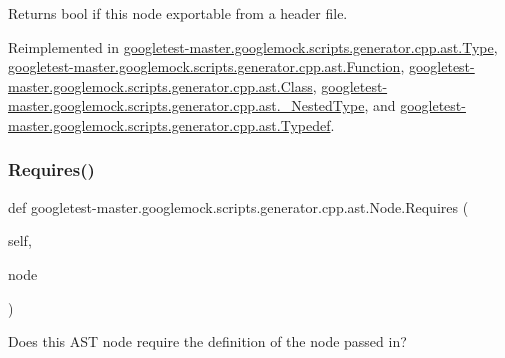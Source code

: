 \begin{DoxyVerb}Returns bool if this node exportable from a header file.\end{DoxyVerb}
 

Reimplemented in \mbox{\hyperlink{classgoogletest-master_1_1googlemock_1_1scripts_1_1generator_1_1cpp_1_1ast_1_1_type_a964085017b8352d9dfe441d1608ee5f4}{googletest-\/master.\+googlemock.\+scripts.\+generator.\+cpp.\+ast.\+Type}}, \mbox{\hyperlink{classgoogletest-master_1_1googlemock_1_1scripts_1_1generator_1_1cpp_1_1ast_1_1_function_a41dc0bcce788576f9d71c0d49dcdb620}{googletest-\/master.\+googlemock.\+scripts.\+generator.\+cpp.\+ast.\+Function}}, \mbox{\hyperlink{classgoogletest-master_1_1googlemock_1_1scripts_1_1generator_1_1cpp_1_1ast_1_1_class_a3b7f1d83393fd1bdd228a4e3be88f21f}{googletest-\/master.\+googlemock.\+scripts.\+generator.\+cpp.\+ast.\+Class}}, \mbox{\hyperlink{classgoogletest-master_1_1googlemock_1_1scripts_1_1generator_1_1cpp_1_1ast_1_1___nested_type_a3d7a181db0d658987b9b331949bf028e}{googletest-\/master.\+googlemock.\+scripts.\+generator.\+cpp.\+ast.\+\_\+\+Nested\+Type}}, and \mbox{\hyperlink{classgoogletest-master_1_1googlemock_1_1scripts_1_1generator_1_1cpp_1_1ast_1_1_typedef_ab5842a52e15d34455267c31672080cb2}{googletest-\/master.\+googlemock.\+scripts.\+generator.\+cpp.\+ast.\+Typedef}}.

\mbox{\label{classgoogletest-master_1_1googlemock_1_1scripts_1_1generator_1_1cpp_1_1ast_1_1_node_a2e88d3bf96b19fe72c26eec93e104381}} 
\subsubsection{\texorpdfstring{Requires()}{Requires()}}
{\footnotesize\ttfamily def googletest-\/master.\+googlemock.\+scripts.\+generator.\+cpp.\+ast.\+Node.\+Requires (\begin{DoxyParamCaption}\item[{}]{self,  }\item[{}]{node }\end{DoxyParamCaption})}

\begin{DoxyVerb}Does this AST node require the definition of the node passed in?\end{DoxyVerb}
 

